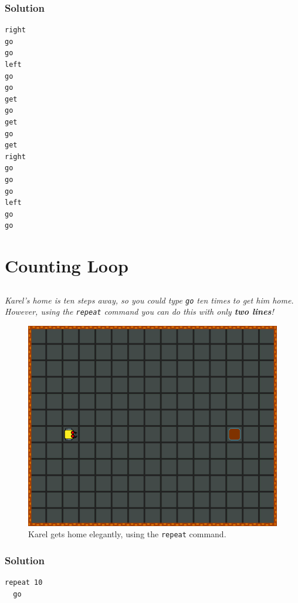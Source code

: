 \documentclass[article,A4,12pt]{llncs}
\begin{document}
{{\subsubsection{Solution}

\begin{verbatim}
right
go
go
left
go
go
get
go
get
go
get
right
go
go
go
left
go
go
\end{verbatim}

\newpage
\setcounter{section}{5}
\section{Counting Loop}

\subsection{}

{\em Karel's home is ten steps away, so you could type {\tt go} ten times to get him home. However, using the {\tt repeat} command you can do this with only {\bf two lines}! 

\begin{figure}[!ht]
\begin{center}
\includegraphics[height=0.4\textwidth]{imgk/c01.png}
\end{center}
\vspace{-4mm}
\caption{Karel gets home elegantly, using the {\tt repeat} command.}
\label{fig:c01}
\vspace{-4mm}
\end{figure}
\noindent

\subsubsection{Solution}
\begin{verbatim}
repeat 10
  go
\end{verbatim}

\newpage
\subsection{}

}}}
\end{document}
